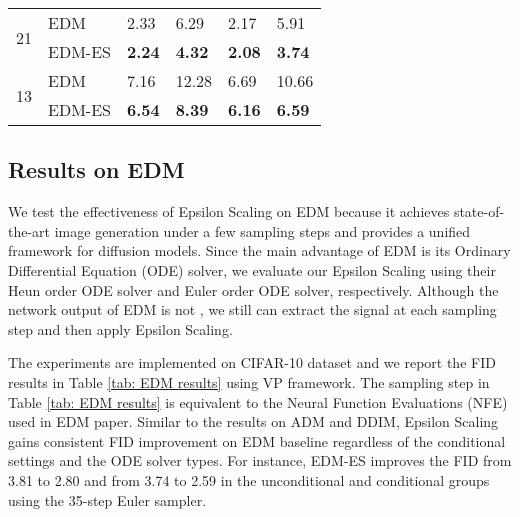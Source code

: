\documentclass{article} \usepackage{iclr2024_conference,times}
\begin{document}
\begin{table*}[ht]
\begin{minipage}{0.46\linewidth}
\begin{center}
\begin{tabular}{@{}llllll@{}}
    \multirow{2}{*}{21} & EDM & 2.33 & 6.29 & 2.17 & 5.91 \\
     & EDM-ES & \textbf{2.24} & \textbf{4.32} & \textbf{2.08} & \textbf{3.74} \\ \midrule
    \multirow{2}{*}{13} & EDM & 7.16 & 12.28 & 6.69 & 10.66 \\
     & EDM-ES & \textbf{6.54} & \textbf{8.39} & \textbf{6.16} & \textbf{6.59} \\ \bottomrule
    \end{tabular}
    \end{center}
  \end{minipage}
\vskip -0.1in
\end{table*}





\subsection{Results on EDM}
We test the effectiveness of Epsilon Scaling on EDM \citep{karras2022elucidating} because it achieves state-of-the-art image generation under a few sampling steps and provides a unified framework for diffusion models. Since the main advantage of EDM is its Ordinary Differential Equation (ODE) solver, we evaluate our Epsilon Scaling using their Heun  order ODE solver \citep{ascher1998computer} and Euler  order ODE solver, respectively. Although the network output of EDM is not , we still can extract the signal  at each sampling step and then apply Epsilon Scaling. 

The experiments are implemented on CIFAR-10 dataset and we report the FID results in Table \ref{tab: EDM results} using VP framework. The sampling step  in Table \ref{tab: EDM results} is equivalent to the Neural Function Evaluations (NFE) used in EDM paper. Similar to the results on ADM and DDIM, Epsilon Scaling gains consistent FID improvement on EDM baseline regardless of the conditional settings and the ODE solver types. For instance, EDM-ES improves the FID from 3.81 to 2.80 and from 3.74 to 2.59 in the unconditional and conditional groups using the 35-step Euler sampler.
\end{document}
